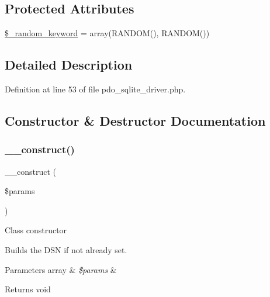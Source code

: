 \subsection*{Protected Attributes}
\begin{DoxyCompactItemize}
\item 
\mbox{\hyperlink{class_c_i___d_b__pdo__sqlite__driver_a10213aa6e05f6d924d3277bb1d2fea00}{\$\+\_\+random\+\_\+keyword}} = array(\textquotesingle{}R\+A\+N\+D\+OM()\textquotesingle{}, \textquotesingle{}R\+A\+N\+D\+OM()\textquotesingle{})
\end{DoxyCompactItemize}


\subsection{Detailed Description}


Definition at line 53 of file pdo\+\_\+sqlite\+\_\+driver.\+php.



\subsection{Constructor \& Destructor Documentation}
\mbox{\label{class_c_i___d_b__pdo__sqlite__driver_a9162320adff1a1a4afd7f2372f753a3e}} 
\subsubsection{\texorpdfstring{\_\_construct()}{\_\_construct()}}
{\footnotesize\ttfamily \+\_\+\+\_\+construct (\begin{DoxyParamCaption}\item[{}]{\$params }\end{DoxyParamCaption})}

Class constructor

Builds the D\+SN if not already set.


\begin{DoxyParams}[1]{Parameters}
array & {\em \$params} & \\
\hline
\end{DoxyParams}
\begin{DoxyReturn}{Returns}
void 
\end{DoxyReturn}


